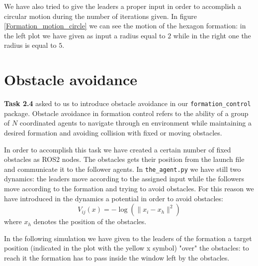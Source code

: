 \documentclass[a4paper,11pt,oneside]{book}
\begin{document}
\bigskip
We have also tried to give the leaders a proper input in order to accomplish a circular motion during the number of iterations given. In figure \ref{Formation_motion_circle} we can see the motion of the hexagon formation: in the left plot we have given as input a radius equal to $2$ while in the right one the radius is equal to $5$.



\section{Obstacle avoidance}
\textbf{Task 2.4} asked to us to introduce obstacle avoidance in our \texttt{formation\_control} package. Obstacle avoidance in formation control refers to the ability of a group of $N$ coordinated agents to navigate through en environment while maintaining a desired formation and avoiding collision with fixed or moving obstacles. 

In order to accomplish this task we have created a certain number of fixed obstacles as ROS2 nodes. The obstacles gets their position from the launch file and communicate it to the follower agents. 
In \texttt{the\_agent.py} we have still two dynamics: the leaders move according to the assigned input while the followers move according to the formation and trying to avoid obstacles. For this reason we have introduced in the dynamics a potential in order to avoid obstacles:
\begin{equation}
V_{ij}(x) = - \log( \lVert x_i - x_h\rVert ^2)
\label{Obstacles_barrier}
\end{equation}
where $x_h$ denotes the position of the obstacles.

In the following simulation we have given to the leaders of the formation a target position (indicated in the plot with the yellow x symbol) "over" the obstacles: to reach it the formation has to pass inside the window left by the obstacles. 
\end{document}
